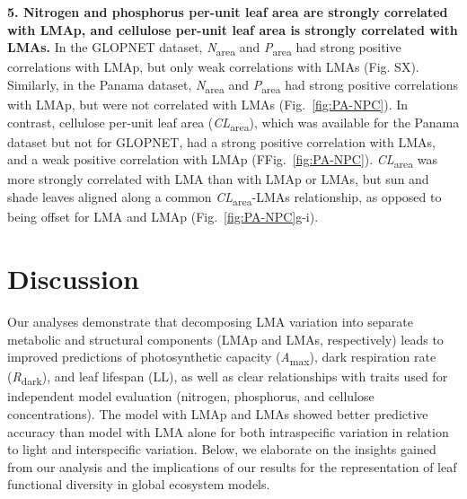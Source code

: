 \documentclass[
  12pt,
  a4paper,
,tablecaptionabove
]{scrartcl}
\begin{document}
\textbf{5. Nitrogen and phosphorus per-unit leaf area are strongly correlated with LMAp, and cellulose per-unit leaf area is strongly correlated with LMAs.}
In the GLOPNET dataset, \emph{N}\textsubscript{area} and \emph{P}\textsubscript{area} had strong positive correlations with LMAp, but only weak correlations with LMAs (Fig. SX).
Similarly, in the Panama dataset, \emph{N}\textsubscript{area} and \emph{P}\textsubscript{area} had strong positive correlations with LMAp, but were not correlated with LMAs (Fig.~\ref{fig:PA-NPC}).
In contrast, cellulose per-unit leaf area (\emph{CL}\textsubscript{area}), which was available for the Panama dataset but not for GLOPNET, had a strong positive correlation with LMAs, and a weak positive correlation with LMAp (FFig.~\ref{fig:PA-NPC}).
\emph{CL}\textsubscript{area} was more strongly correlated with LMA than with LMAp or LMAs, but sun and shade leaves aligned along a common \emph{CL}\textsubscript{area}-LMAs relationship, as opposed to being offset for LMA and LMAp (Fig.~\ref{fig:PA-NPC}g-i).

\hypertarget{discussion}{%
\section{Discussion}\label{discussion}}

Our analyses demonstrate that decomposing LMA variation into separate metabolic and structural components (LMAp and LMAs, respectively) leads to improved predictions of photosynthetic capacity (\emph{A}\textsubscript{max}), dark respiration rate (\emph{R}\textsubscript{dark}), and leaf lifespan (LL), as well as clear relationships with traits used for independent model evaluation (nitrogen, phosphorus, and cellulose concentrations).
The model with LMAp and LMAs showed better predictive accuracy than model with LMA alone for both intraspecific variation in relation to light and interspecific variation.
Below, we elaborate on the insights gained from our analysis and the implications of our results for the representation of leaf functional diversity in global ecosystem models.
\end{document}

